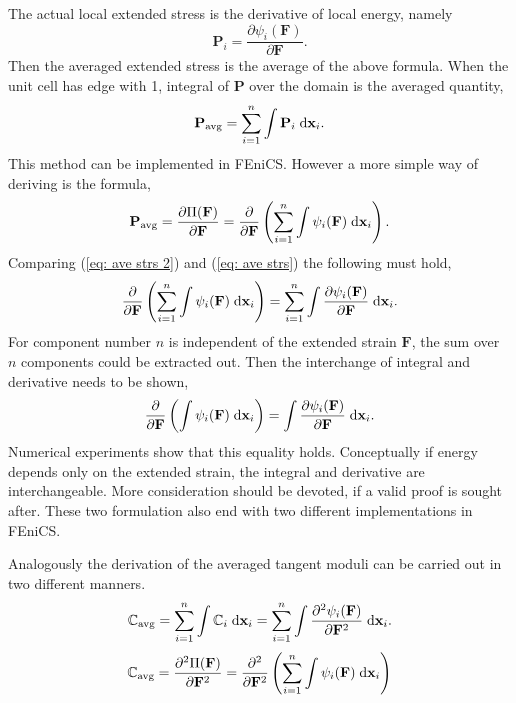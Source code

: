 The actual local extended stress is the derivative of local energy, namely
\begin{equation}
\label{eq: loc en}
\mathbf{P}_{i} = \dfrac{\partial \psi_{i}(\mathbf{F})}{\partial \mathbf{F}}.
\end{equation}
Then the averaged extended stress is the average of the above formula. When the unit cell has edge with 1, integral of $\mathbf{P}$ over the domain is the averaged quantity,
\begin{equation}
\label{eq: ave strs}
\mathbf{P}_{\text{avg}} = \sum^{n}_{i=1} \int \mathbf{P}_{i} \;\mathrm{d}{\mathbf{x}_{i}}.
\end{equation}
This method can be implemented in FEniCS. However a more simple way of deriving is the formula,
\begin{equation}
\label{eq: ave strs 2}
\mathbf{P}_{\text{avg}} = \dfrac{\partial \Pi(\mathbf{F})}{\partial \mathbf{F}} = \dfrac{\partial}{\partial \mathbf{F}} \left( \sum^{n}_{i=1} \int \psi_{i}(\mathbf{F}) \;\mathrm{d}{\mathbf{x}_{i}} \right).
\end{equation}
Comparing (\ref{eq: ave strs 2}) and (\ref{eq: ave strs}) the following must hold,
\begin{equation}
\label{eq: equality}
\dfrac{\partial}{\partial \mathbf{F}} \left( \sum^{n}_{i=1} \int \psi_{i}(\mathbf{F}) \;\mathrm{d}{\mathbf{x}_{i}} \right) = \sum^{n}_{i=1} \int \dfrac{\partial \psi_{i}(\mathbf{F})}{\partial \mathbf{F}} \;\mathrm{d}{\mathbf{x}_{i}}.
\end{equation}
For component number $n$ is independent of the extended strain $\mathbf{F}$, the sum over $n$ components could be extracted out. Then the interchange of integral and derivative needs to be shown, 
\begin{equation}
\label{eq: interchange}
\dfrac{\partial}{\partial \mathbf{F}} \left( \int \psi_{i}(\mathbf{F}) \;\mathrm{d}{\mathbf{x}_{i}} \right) = \int \dfrac{\partial \psi_{i}(\mathbf{F})}{\partial \mathbf{F}} \;\mathrm{d}{\mathbf{x}_{i}}.
\end{equation}
Numerical experiments show that this equality holds. Conceptually if energy depends only on the extended strain, the integral and derivative are interchangeable. More consideration should be devoted, if a valid proof is sought after. These two formulation also end with two different implementations in FEniCS.

Analogously the derivation of the averaged tangent moduli can be carried out in two different manners. 
\begin{equation}
\label{eq: tan mod}
\mathbb{C}_{\text{avg}} = \sum^{n}_{i=1} \int \mathbb{C}_{i} \;\mathrm{d}{\mathbf{x}_{i}} = \sum^{n}_{i=1} \int \dfrac{\partial^{2} \psi_{i}(\mathbf{F})}{\partial \mathbf{F}^{2}} \;\mathrm{d}{\mathbf{x}_{i}}.
\end{equation}
\begin{equation}
\label{eq: tan mod 2}
\mathbb{C}_{\text{avg}} = \dfrac{\partial^{2} \Pi(\mathbf{F})}{\partial \mathbf{F}^{2}} = \dfrac{\partial^{2}}{\partial \mathbf{F}^{2}} \left( \sum^{n}_{i=1} \int \psi_{i}(\mathbf{F}) \;\mathrm{d}{\mathbf{x}_{i}} \right)
\end{equation}

